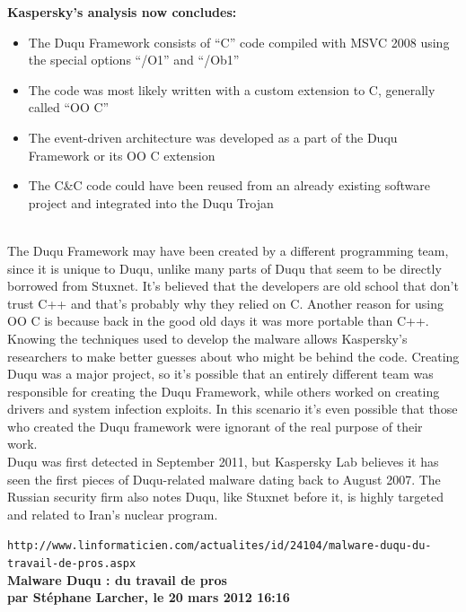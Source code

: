 \documentclass[11pt,twoside,a4paper]{article}
\begin{document}
\textbf{Kaspersky's analysis now concludes:}
\begin{itemize}
	\item The Duqu Framework consists of ``C'' code compiled with MSVC 2008 using the special options ``/O1'' and ``/Ob1''
	\item The code was most likely written with a custom extension to C, generally called ``OO C''
	\item The event-driven architecture was developed as a part of the Duqu Framework or its OO C extension
	\item The C\&C code could have been reused from an already existing software project and integrated into the Duqu Trojan
\end{itemize}~\\

The Duqu Framework may have been created by a different programming team, since it is unique to Duqu, unlike many parts of Duqu that seem to be directly borrowed from Stuxnet. It's believed that the developers are old school that don't trust C++ and that's probably why they relied on C. Another reason for using OO C is because back in the good old days it was more portable than C++.~\\ 

Knowing the techniques used to develop the malware allows Kaspersky's researchers to make better guesses about who might be behind the code. Creating Duqu was a major project, so it's possible that an entirely different team was responsible for creating the Duqu Framework, while others worked on creating drivers and system infection exploits. In this scenario it's even possible that those who created the Duqu framework were ignorant of the real purpose of their work.~\\

Duqu was first detected in September 2011, but Kaspersky Lab believes it has seen the first pieces of Duqu-related malware dating back to August 2007. The Russian security firm also notes Duqu, like Stuxnet before it, is highly targeted and related to Iran's nuclear program.~\\

\clearpage

\texttt{http://www.linformaticien.com/actualites/id/24104/malware-duqu-du-travail-de-pros.aspx}~\\

\textbf{\LARGE Malware Duqu : du travail de pros}~\\

\textbf{\small par St{\'e}phane Larcher, le 20 mars 2012 16:16}~\\
\end{document}
